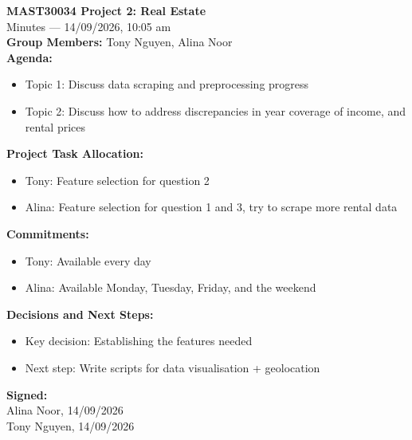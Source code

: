 \documentclass[11pt]{article}
\begin{document}
\renewcommand\sfdefault{phv}
\renewcommand\mddefault{mc}
\sffamily

\textbf{MAST30034 Project 2: Real Estate} \\
Minutes --- 14/09/2026, 10:05 am \\

\textbf{Group Members: } Tony Nguyen, Alina Noor\\

\textbf{Agenda:}
\begin{itemize}
    \item Topic 1: Discuss data scraping and preprocessing progress
    \item Topic 2: Discuss how to address discrepancies in year coverage of income, and rental prices
\end{itemize}

\textbf{Project Task Allocation:}
\begin{itemize}
    \item Tony: Feature selection for question 2
    \item Alina: Feature selection for question 1 and 3, try to scrape more rental data
\end{itemize}

\textbf{Commitments:}
\begin{itemize}
    \item Tony: Available every day
    \item Alina: Available Monday, Tuesday, Friday, and the weekend
\end{itemize}
\textbf{Decisions and Next Steps:}
\begin{itemize}
    \item Key decision: Establishing the features needed
    \item Next step: Write scripts for data visualisation + geolocation
\end{itemize}
\textbf{Signed: } \\
Alina Noor, 14/09/2026 \\
Tony Nguyen, 14/09/2026
\end{document}
